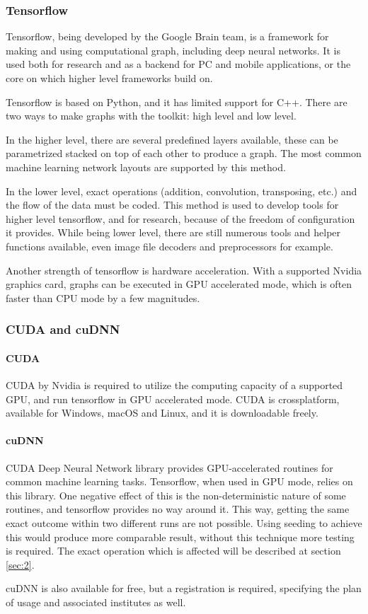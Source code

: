 \documentclass[a4paper,12pt]{article}
\begin{document}
\subsubsection{Tensorflow}
Tensorflow, being developed by the Google Brain team, is a framework for making and using computational graph, including deep neural networks. It is used both for research and as a backend for PC and mobile applications, or the core on which higher level frameworks build on.\par
Tensorflow is based on Python, and it has limited support for C++. There are two ways to make graphs with the toolkit: high level and low level.\par
In the higher level, there are several predefined layers available, these can be parametrized stacked on top of each other to produce a graph. The most common machine learning network layouts are supported by this method.\par
In the lower level, exact operations (addition, convolution, transposing, etc.) and the flow of the data must be coded. This method is used to develop tools for higher level tensorflow, and for research, because of the freedom of configuration it provides. While being lower level, there are still numerous tools and helper functions available, even image file decoders and preprocessors for example.\par
Another strength of tensorflow is hardware acceleration. With a supported Nvidia graphics card, graphs can be executed in GPU accelerated mode, which is often faster than CPU mode by a few magnitudes.
\subsubsection{CUDA and cuDNN}
\paragraph{CUDA}
CUDA by Nvidia is required to utilize the computing capacity of a supported GPU, and run tensorflow in GPU accelerated mode. CUDA is crossplatform, available for 	Windows, macOS and Linux, and it is downloadable freely.
\paragraph{cuDNN} \label{sec:1}
CUDA Deep Neural Network library provides GPU-accelerated routines for common machine learning tasks. Tensorflow, when used in GPU mode, relies on this library. One negative effect of this is the non-deterministic nature of some routines, and tensorflow provides no way around it. This way, getting the same exact outcome within two different runs are not possible. Using seeding to achieve this would produce more comparable result, without this technique more testing is required. The exact operation which is affected will be described at section \ref{sec:2}.\par
cuDNN is also available for free, but a registration is required, specifying the plan of usage and associated institutes as well.
\end{document}
